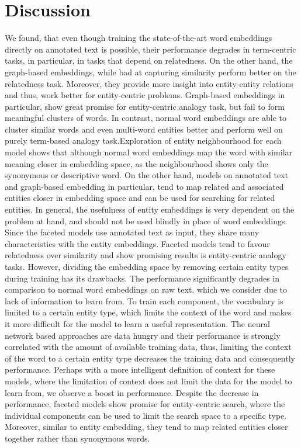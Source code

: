 \section{Discussion}
We found, that even though training the state-of-the-art word embeddings directly on annotated text is possible, their performance degrades in term-centric tasks, in particular, in tasks that depend on relatedness. On the other hand, the graph-based embeddings, while bad at capturing similarity perform better on the relatedness task. Moreover, they provide more insight into entity-entity relations and thus, work better for entity-centric problems. Graph-based embeddings in particular, show great promise for entity-centric analogy task, but fail to form meaningful clusters of words. In contrast, normal word embeddings are able to cluster similar words and even multi-word entities better and perform well on purely term-based analogy task.Exploration of entity neighbourhood for each model shows that although normal word embeddings map the word with similar meaning closer in embedding space, as the neighbourhood shows only the synonymous or descriptive word. On the other hand, models on annotated text and graph-based embedding in particular, tend to map related and associated entities closer in embedding space and can be used for searching for related entities. In general, the usefulness of entity embeddings is very dependent on the problem at hand, and should not be used blindly in place of word embeddings.
  \\
Since the faceted models use annotated text as input, they share many characteristics with the entity embeddings. Faceted models tend to favour relatedness over similarity and show promising results is entity-centric analogy tasks. However, dividing the embedding space by removing certain entity types during training has its drawbacks. The performance significantly degrades in comparison to normal word embeddings on raw text, which we consider due to lack of information to learn from. To train each component, the vocabulary is limited to a certain entity type, which limits the context of the word and makes it more difficult for the model to learn a useful representation. The neural network based approaches are data hungry and their performance is strongly correlated with the amount of available training data, thus, limiting the context of the word to a certain entity type decreases the training data and consequently performance. Perhaps with a more intelligent definition of context for these models, where the limitation of context does not limit the data for the model to learn from, we observe a boost in performance. Despite the decrease in performance, faceted models show promise for entity-centric search, where the individual components can be used to limit the search space to a specific type. Moreover, similar to  entity embedding, they tend to map related entities closer together rather than synonymous words. 
